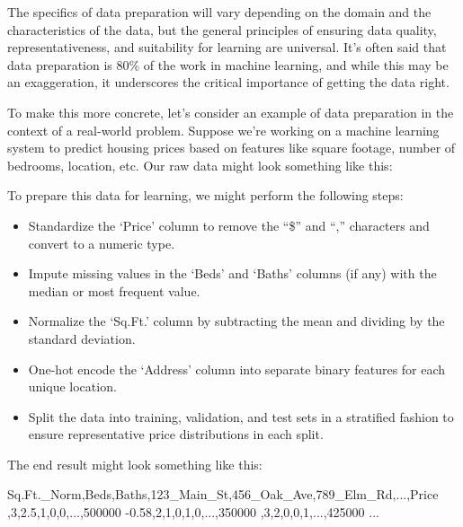 \documentclass[
  9pt,
  letterpaper,
  abstract,
  titlepage]{scrbook}
\newenvironment{Shaded}{\begin{snugshade}}{\end{snugshade}}
\newcommand{\NormalTok}[1]{\textcolor[rgb]{0.00,0.23,0.31}{#1}}
\begin{document}
The specifics of data preparation will vary depending on the domain and
the characteristics of the data, but the general principles of ensuring
data quality, representativeness, and suitability for learning are
universal. It's often said that data preparation is 80\% of the work in
machine learning, and while this may be an exaggeration, it underscores
the critical importance of getting the data right.

To make this more concrete, let's consider an example of data
preparation in the context of a real-world problem. Suppose we're
working on a machine learning system to predict housing prices based on
features like square footage, number of bedrooms, location, etc. Our raw
data might look something like this:

\begin{Shaded}
\end{Shaded}

To prepare this data for learning, we might perform the following steps:

\begin{itemize}
\item
  Standardize the `Price' column to remove the ``\$'' and ``,''
  characters and convert to a numeric type.
\item
  Impute missing values in the `Beds' and `Baths' columns (if any) with
  the median or most frequent value.
\item
  Normalize the `Sq.Ft.' column by subtracting the mean and dividing by
  the standard deviation.
\item
  One-hot encode the `Address' column into separate binary features for
  each unique location.
\item
  Split the data into training, validation, and test sets in a
  stratified fashion to ensure representative price distributions in
  each split.
\end{itemize}

The end result might look something like this:

\begin{Shaded}
\begin{Highlighting}[]
\NormalTok{Sq.Ft.\_Norm,Beds,Baths,123\_Main\_St,456\_Oak\_Ave,789\_Elm\_Rd,...,Price}
\NormalTok{,3,2.5,1,0,0,...,500000}
\NormalTok{{-}0.58,2,1,0,1,0,...,350000}
\NormalTok{,3,2,0,0,1,...,425000}
\NormalTok{...}
\end{Highlighting}
\end{Shaded}
\end{document}

